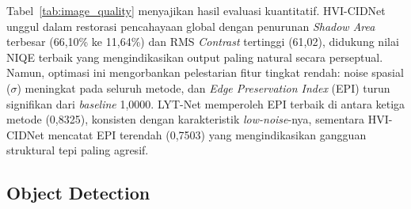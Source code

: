 \documentclass[conference]{IEEEtran}
\begin{document}
Tabel~\ref{tab:image_quality} menyajikan hasil evaluasi kuantitatif. 
HVI-CIDNet unggul dalam restorasi pencahayaan global dengan penurunan 
\textit{Shadow Area} terbesar (66,10\% ke 11,64\%) dan RMS \textit{Contrast} 
tertinggi (61,02), didukung nilai NIQE terbaik yang mengindikasikan output 
paling natural secara perseptual. Namun, optimasi ini mengorbankan pelestarian 
fitur tingkat rendah: noise spasial ($\sigma$) meningkat pada seluruh metode, 
dan \textit{Edge Preservation Index} (EPI) turun signifikan dari 
\textit{baseline} 1,0000. LYT-Net memperoleh EPI terbaik di antara ketiga 
metode (0,8325), konsisten dengan karakteristik \textit{low-noise}-nya, 
sementara HVI-CIDNet mencatat EPI terendah (0,7503) yang mengindikasikan 
gangguan struktural tepi paling agresif.

\begin{table}[htbp]
\centering
\caption{Quantitative Comparison of Image Quality and Spatial Feature 
Degradation Across LLIE Methods}
\label{tab:image_quality}
\end{table}


\subsection{Object Detection}
 
\end{document}
